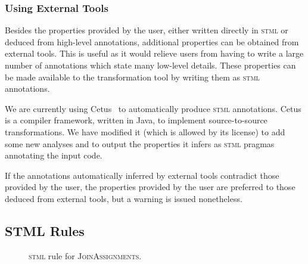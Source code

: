 \documentclass[svgnames,usenames,preprint,nocopyrightspace]{sigplanconf}
\newcommand{\stml}{\textsc{stml}\xspace}
\newcommand{\showrule}[2]{\begin{figure}
 
 \caption{\stml rule for \textsc{#1}.}
 \label{fig:stml-rule-#1}
\end{figure}
}
\begin{document}
\subsubsection{Using External Tools}

Besides the properties provided by the user, either written directly
in \stml or deduced from high-level annotations, additional properties
can be obtained from external tools.  This is useful as it would
relieve users from having to write a large number of annotations which
state many low-level details.  These properties can be made available
to the transformation tool by writing them as \stml annotations.



We are currently using Cetus~\cite{dave2009cetus} to automatically
produce \stml annotations.  Cetus is a compiler framework, written in
Java, to implement source-to-source transformations. We have modified
it (which is allowed by its license) to add some new analyses and to
output the properties it infers as \stml pragmas annotating the
input code.



If the annotations automatically inferred by external tools contradict
those provided by the user, the properties provided by the user are
preferred to those deduced from external tools, but a warning is
issued nonetheless.







\subsection{STML Rules}
\label{sec:stml_rules}














\showrule{JoinAssignments}{cml_rules/rule3.c}
\end{document}
